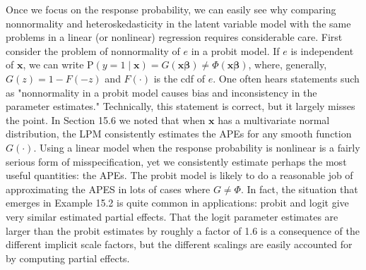 \documentclass[10pt]{article}
\begin{document}
Once we focus on the response probability, we can easily see why comparing nonnormality and heteroskedasticity in the latent variable model with the same problems in a linear (or nonlinear) regression requires considerable care. First consider the problem of nonnormality of $e$ in a probit model. If $e$ is independent of $\mathbf{x}$, we can write $\mathrm{P}(y=1 \mid \mathbf{x})=G(\mathbf{x} \boldsymbol{\beta}) \neq \Phi(\mathbf{x} \boldsymbol{\beta})$, where, generally, $G(z)=1-F(-z)$ and $F(\cdot)$ is the cdf of $e$. One often hears statements such as "nonnormality in a probit model causes bias and inconsistency in the parameter estimates." Technically, this statement is correct, but it largely misses the point. In Section 15.6 we noted that when $\mathbf{x}$ has a multivariate normal distribution, the LPM consistently estimates the APEs for any smooth function $G(\cdot)$. Using a linear model when the response probability is nonlinear is a fairly serious form of misspecification, yet we consistently estimate perhaps the most useful quantities: the APEs. The probit model is likely to do a reasonable job of approximating the APES in lots of cases where $G \neq \Phi$. In fact, the situation that emerges in Example 15.2 is quite common in applications: probit and logit give very similar estimated partial effects. That the logit parameter estimates are larger than the probit estimates by roughly a factor of 1.6 is a consequence of the different implicit scale factors, but the different scalings are easily accounted for by computing partial effects.
\end{document}
